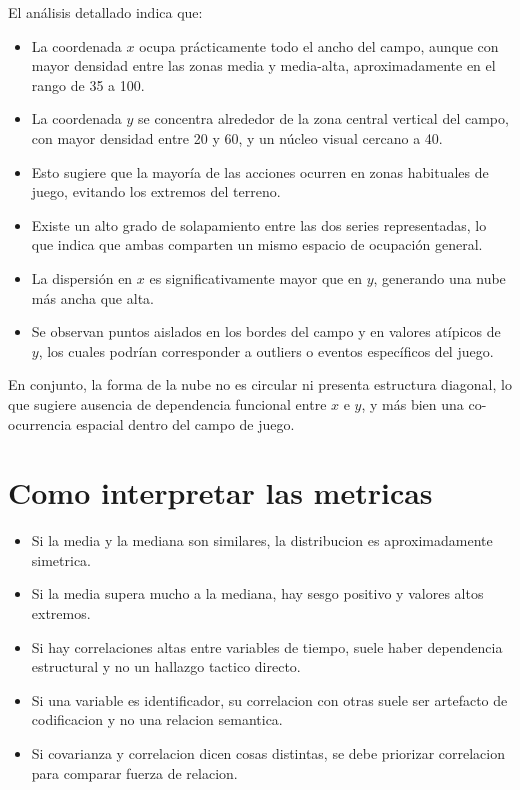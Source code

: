 \documentclass[12pt,a4paper]{article}
\begin{document}
El análisis detallado indica que:

\begin{itemize}
    \item La coordenada $x$ ocupa prácticamente todo el ancho del campo, aunque con mayor densidad entre las zonas media y media-alta, aproximadamente en el rango de 35 a 100.
    \item La coordenada $y$ se concentra alrededor de la zona central vertical del campo, con mayor densidad entre 20 y 60, y un núcleo visual cercano a 40.
    \item Esto sugiere que la mayoría de las acciones ocurren en zonas habituales de juego, evitando los extremos del terreno.
    \item Existe un alto grado de solapamiento entre las dos series representadas, lo que indica que ambas comparten un mismo espacio de ocupación general.
    \item La dispersión en $x$ es significativamente mayor que en $y$, generando una nube más ancha que alta.
    \item Se observan puntos aislados en los bordes del campo y en valores atípicos de $y$, los cuales podrían corresponder a outliers o eventos específicos del juego.
\end{itemize}

En conjunto, la forma de la nube no es circular ni presenta estructura diagonal, lo que sugiere ausencia de dependencia funcional entre $x$ e $y$, y más bien una co-ocurrencia espacial dentro del campo de juego.

\section{Como interpretar las metricas}
\begin{itemize}
  \item Si la media y la mediana son similares, la distribucion es aproximadamente simetrica.
  \item Si la media supera mucho a la mediana, hay sesgo positivo y valores altos extremos.
  \item Si hay correlaciones altas entre variables de tiempo, suele haber dependencia estructural y no un hallazgo tactico directo.
  \item Si una variable es identificador, su correlacion con otras suele ser artefacto de codificacion y no una relacion semantica.
  \item Si covarianza y correlacion dicen cosas distintas, se debe priorizar correlacion para comparar fuerza de relacion.
\end{itemize}
\end{document}
